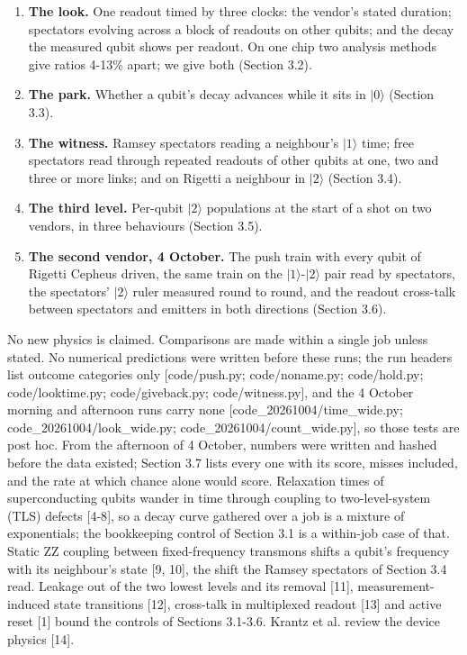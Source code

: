\documentclass[11pt]{article}
\begin{document}
\begin{enumerate}
\item \textbf{The look.} One readout timed by three clocks: the vendor's stated duration; spectators evolving across a block of readouts on other qubits; and the decay the measured qubit shows per readout. On one chip two analysis methods give ratios 4-13\% apart; we give both (Section 3.2).
\item \textbf{The park.} Whether a qubit's decay advances while it sits in \(|0\rangle\) (Section 3.3).
\item \textbf{The witness.} Ramsey spectators reading a neighbour's \(|1\rangle\) time; free spectators read through repeated readouts of other qubits at one, two and three or more links; and on Rigetti a neighbour in \(|2\rangle\) (Section 3.4).
\item \textbf{The third level.} Per-qubit \(|2\rangle\) populations at the start of a shot on two vendors, in three behaviours (Section 3.5).
\item \textbf{The second vendor, 4 October.} The push train with every qubit of Rigetti Cepheus driven, the same train on the \(|1\rangle\)-\(|2\rangle\) pair read by spectators, the spectators' \(|2\rangle\) ruler measured round to round, and the readout cross-talk between spectators and emitters in both directions (Section 3.6).
\end{enumerate}
No new physics is claimed. Comparisons are made within a single job unless stated. No numerical predictions were written before these runs; the run headers list outcome categories only {[}code/push.py; code/noname.py; code/hold.py; code/looktime.py; code/giveback.py; code/witness.py{]}, and the 4 October morning and afternoon runs carry none {[}code\_20261004/time\_wide.py; code\_20261004/look\_wide.py; code\_20261004/count\_wide.py{]}, so those tests are post hoc. From the afternoon of 4 October, numbers were written and hashed before the data existed; Section 3.7 lists every one with its score, misses included, and the rate at which chance alone would score. Relaxation times of superconducting qubits wander in time through coupling to two-level-system (TLS) defects {[}4-8{]}, so a decay curve gathered over a job is a mixture of exponentials; the bookkeeping control of Section 3.1 is a within-job case of that. Static ZZ coupling between fixed-frequency transmons shifts a qubit's frequency with its neighbour's state {[}9, 10{]}, the shift the Ramsey spectators of Section 3.4 read. Leakage out of the two lowest levels and its removal {[}11{]}, measurement-induced state transitions {[}12{]}, cross-talk in multiplexed readout {[}13{]} and active reset {[}1{]} bound the controls of Sections 3.1-3.6. Krantz et al. review the device physics {[}14{]}.
\end{document}
